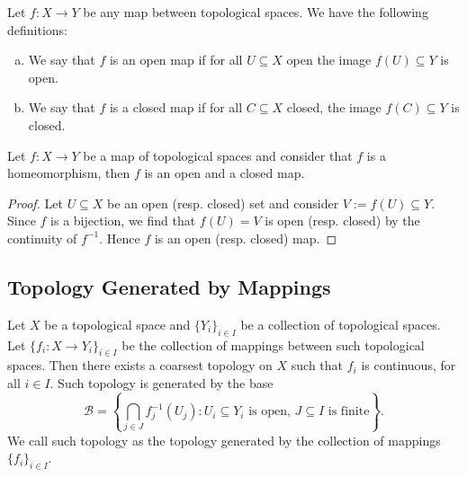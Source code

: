 \begin{definition}
  \label{def: open/closed maps}
  Let \(f : X \to Y\) be any map between topological spaces. We have the
  following definitions:
  \begin{enumerate}[(a)]
    \item We say that \(f\) is an open map if for all \(U \subseteq X\) open the
      image \(f(U) \subseteq Y\) is open.
    \item We say that \(f\) is a closed map if for all \(C \subseteq X\) closed,
      the image \(f(C) \subseteq Y\) is closed.
  \end{enumerate}
\end{definition}

\begin{proposition}
  Let \(f: X \to Y\) be a map of topological spaces and consider that \(f\) is a
  homeomorphism, then \(f\) is an open and a closed map.
\end{proposition}

\begin{proof}
  Let \(U \subseteq X\) be an open (resp. closed) set and consider \(V := f(U)
  \subseteq Y\).  Since \(f\) is a bijection, we find that \(f(U) = V\) is open
  (resp. closed) by the continuity of \(f^{-1}\). Hence \(f\) is an open (resp.
  closed) map.
\end{proof}

\subsection{Topology Generated by Mappings}

\begin{proposition}
  \label{prop: top generated by collection of maps}
  Let \(X\) be a topological space and \(\{Y_i\}_{i \in I}\) be a collection of
  topological spaces. Let \(\{f_i : X \to Y_i\}_{i \in I}\) be the collection of
  mappings between such topological spaces. Then there exists a coarsest
  topology on \(X\) such that \(f_i\) is continuous, for all \(i \in I\). Such
  topology is generated by the base
  \[
    \mathcal B = \left\{ \bigcap_{j \in J} f_j^{-1}(U_j) : U_i \subseteq Y_i
    \text{ is open, } J \subseteq I \text{ is finite}\right\}.
  \]
  We call such topology as the topology generated by the collection of mappings
  \(\{f_i\}_{i \in I}\).
\end{proposition}

